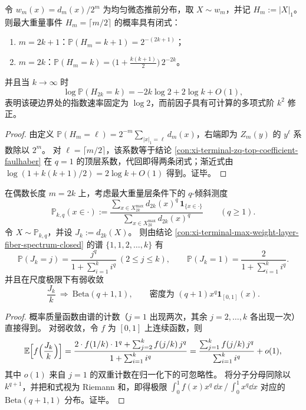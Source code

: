 \begin{conclusion}[硬边界事件的精确概率：\texorpdfstring{$H_m=\lceil m/2\rceil$}{H_m=ceil(m/2)} 的多项式前因子]\label{con:xi-terminal-hard-boundary-event-probability}
令 \(w_m(x)=d_m(x)/2^m\) 为均匀微态推前分布，取 \(X\sim w_m\)，并记 \(H_m:=|X|_1\)。
则最大重量事件 \(H_m=\lceil m/2\rceil\) 的概率具有闭式：
\begin{enumerate}
  \item \(m=2k+1\)：\(\mathbb{P}(H_m=k+1)=2^{-(2k+1)}\)；
  \item \(m=2k\)：\(\mathbb{P}(H_m=k)=\bigl(1+\tfrac{k(k+1)}{2}\bigr)\,2^{-2k}\)。
\end{enumerate}
并且当 \(k\to\infty\) 时
\[
\log \mathbb{P}(H_{2k}=k)= -2k\log 2 +2\log k +O(1),
\]
表明该硬边界处的指数速率固定为 \(\log 2\)，而前因子具有可计算的多项式阶 \(k^2\) 修正。
\end{conclusion}
\begin{proof}
由定义 \(\mathbb{P}(H_m=\ell)=2^{-m}\sum_{|x|_1=\ell}d_m(x)\)，右端即为 \(Z_m(y)\) 的 \(y^\ell\) 系数除以 \(2^m\)。
对 \(\ell=\lceil m/2\rceil\)，该系数等于结论 \ref{con:xi-terminal-zq-top-coefficient-faulhaber} 在 \(q=1\) 的顶层系数，代回即得两条闭式；渐近式由 \(\log(1+k(k+1)/2)=2\log k+O(1)\) 得到。证毕。
\end{proof}

\begin{conclusion}\label{con:xi-terminal-max-weight-escort-beta-limit}
在偶数长度 \(m=2k\) 上，考虑最大重量层条件下的 \(q\)-倾斜测度
\[
\mathbb{P}_{k,q}(x\in\cdot):=\frac{\sum_{x\in X_{2k}^{\max}} d_{2k}(x)^{q}\,\mathbf 1_{\{x\in\cdot\}}}{\sum_{x\in X_{2k}^{\max}} d_{2k}(x)^{q}}
\qquad(q\ge 1).
\]
令 \(X\sim\mathbb{P}_{k,q}\)，并设 \(J_k:=d_{2k}(X)\)。
则由结论 \ref{con:xi-terminal-max-weight-layer-fiber-spectrum-closed} 的谱 \(\{1,1,2,\dots,k\}\) 有
\[
\mathbb{P}(J_k=j)=\frac{j^{q}}{1+\sum_{i=1}^{k} i^{q}}\ (2\le j\le k),\qquad
\mathbb{P}(J_k=1)=\frac{2}{1+\sum_{i=1}^{k} i^{q}}.
\]
并且在尺度极限下有弱收敛
\[
\frac{J_k}{k}\ \Rightarrow\ \mathrm{Beta}(q+1,1),
\qquad \text{密度为 }(q+1)x^{q}\mathbf 1_{[0,1]}(x).
\]
\end{conclusion}
\begin{proof}
概率质量函数由谱的计数（\(j=1\) 出现两次，其余 \(j=2,\dots,k\) 各出现一次）直接得到。
对弱收敛，令 \(f\) 为 \([0,1]\) 上连续函数，则
\[
\mathbb{E}\Bigl[f\Bigl(\frac{J_k}{k}\Bigr)\Bigr]
=\frac{2\cdot f(1/k)\cdot 1^{q}+\sum_{j=2}^{k} f(j/k)\,j^{q}}{1+\sum_{i=1}^{k} i^{q}}
=\frac{\sum_{j=1}^{k} f(j/k)\,j^{q}}{\sum_{i=1}^{k} i^{q}}+o(1),
\]
其中 \(o(1)\) 来自 \(j=1\) 的双重计数在归一化下的可忽略性。
将分子分母同除以 \(k^{q+1}\)，并把和式视为 Riemann 和，即得极限
\(
\int_{0}^{1}f(x)x^{q}\,\dd x\,/\,\int_0^1 x^{q}\dd x
\)
对应的 \(\mathrm{Beta}(q+1,1)\) 分布。证毕。
\end{proof}

